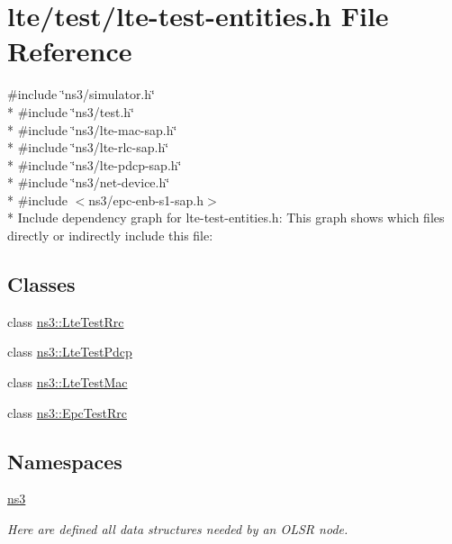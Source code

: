 \hypertarget{lte-test-entities_8h}{}\section{lte/test/lte-\/test-\/entities.h File Reference}
\label{lte-test-entities_8h}
{\ttfamily \#include \char`\"{}ns3/simulator.\+h\char`\"{}}\\*
{\ttfamily \#include \char`\"{}ns3/test.\+h\char`\"{}}\\*
{\ttfamily \#include \char`\"{}ns3/lte-\/mac-\/sap.\+h\char`\"{}}\\*
{\ttfamily \#include \char`\"{}ns3/lte-\/rlc-\/sap.\+h\char`\"{}}\\*
{\ttfamily \#include \char`\"{}ns3/lte-\/pdcp-\/sap.\+h\char`\"{}}\\*
{\ttfamily \#include \char`\"{}ns3/net-\/device.\+h\char`\"{}}\\*
{\ttfamily \#include $<$ns3/epc-\/enb-\/s1-\/sap.\+h$>$}\\*
Include dependency graph for lte-\/test-\/entities.h\+:
This graph shows which files directly or indirectly include this file\+:
\subsection*{Classes}
\begin{DoxyCompactItemize}
\item 
class \hyperlink{classns3_1_1LteTestRrc}{ns3\+::\+Lte\+Test\+Rrc}
\item 
class \hyperlink{classns3_1_1LteTestPdcp}{ns3\+::\+Lte\+Test\+Pdcp}
\item 
class \hyperlink{classns3_1_1LteTestMac}{ns3\+::\+Lte\+Test\+Mac}
\item 
class \hyperlink{classns3_1_1EpcTestRrc}{ns3\+::\+Epc\+Test\+Rrc}
\end{DoxyCompactItemize}
\subsection*{Namespaces}
\begin{DoxyCompactItemize}
\item 
 \hyperlink{namespacens3}{ns3}
\begin{DoxyCompactList}\small\item\em Here are defined all data structures needed by an O\+L\+SR node. \end{DoxyCompactList}\end{DoxyCompactItemize}
